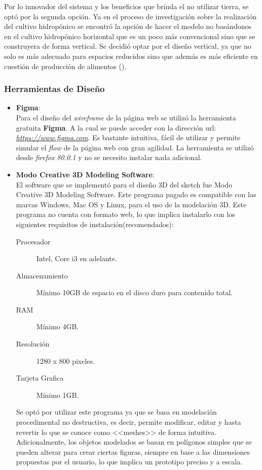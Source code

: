 \noindent Por lo innovador del sistema y los beneficios que brinda el no
utilizar tierra, se optó por la segunda opción. Ya en el proceso de
investigación sobre la realización del cultivo hidropónico se encontró la
opción de hacer el modelo no basándonos en el cultivo hidropónico horizontal
que es un poco más convencional sino que se construyera de forma vertical. Se
decidió optar por el diseño vertical, ya que no solo es más adecuado para
espacios reducidos sino que además es más eficiente en cuestión de producción
de alimentos (\cite{doi:10.1002/fes3.83}).

\subsubsection{Herramientas de Diseño}

\begin{itemize}
    \item \textbf{Figma}: \\
        Para el diseño del \textit{wireframe} de la página web se utilizó la
        herramienta gratuita \textbf{Figma}. A la cual se puede acceder con la
        dirección url: \textit{\href{https://www.figma.com}{https://www.figma.com}}. Es bastante intuitiva,
        fácil de utilizar y permite simular el \textit{flow} de la página web
        con gran agilidad. La herramienta se utilizó desde \textit{firefox
        80.0.1}  y no se necesito instalar nada adicional.
    \item \textbf{Modo Creative 3D Modeling Software}:\\
        El software que se implementó para el diseño 3D del sketch  fue Modo
        Creative 3D Modeling Software. Este programa pagado es compatible con
        las marcas Windows, Mac OS y Linux, para el uso de la modelación 3D.
        Este programa no cuenta con formato web, lo que implica instalarlo con
        los siguientes requisitos de instalación(recomendados):
        \begin{description}
            \item[Procesador] Intel, Core i3 en adelante.
            \item[Almacenamiento] Mínimo 10GB de espacio en el disco duro para
                contenido total.
            \item[RAM] Mínimo 4GB.
            \item[Resolución] 1280 x 800 pixeles.
            \item[Tarjeta Grafica] Mínimo 1GB.
        \end{description}
         Se optó por utilizar este programa ya que se basa en modelación
         procedimental no destructiva, es decir, permite modificar, editar y
         hasta revertir lo que se conoce como <<meshes>>  de forma intuitiva.
         Adicionalmente, los objetos modelados se basan en polígonos simples
         que se pueden alterar para crear ciertas figuras, siempre en base a
         las dimensiones propuestas por el usuario, lo que implica un prototipo
         preciso y a escala.


\end{itemize}
